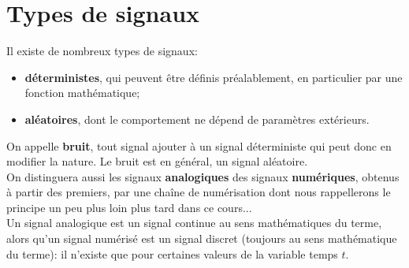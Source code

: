 \documentclass[11pt,a4paper]{article}
\newcounter{ques}
\begin{document}
\section{Types de signaux}
Il existe de nombreux types de signaux:\\
\begin{itemize}[label = ]
\item \textbf{déterministes}, qui peuvent être définis préalablement, en particulier par une fonction mathématique; 
\item \textbf{aléatoires}, dont le comportement ne dépend de paramètres extérieurs.

\end{itemize}
On appelle \textbf{bruit}, tout signal ajouter à un signal déterministe qui peut donc en modifier la nature. Le bruit est en général, un signal aléatoire.\\
On distinguera aussi les signaux \textbf{analogiques} des signaux \textbf{numériques}, obtenus à partir des premiers, par une chaîne de numérisation dont nous rappellerons le principe un peu plus loin plus tard dans ce cours...\\
Un signal analogique est un signal continue au sens mathématiques du terme, alors qu'un signal numérisé est un signal discret (toujours au sens mathématique du terme): il n'existe que pour certaines valeurs de la variable temps $t$.\\
\end{document}
